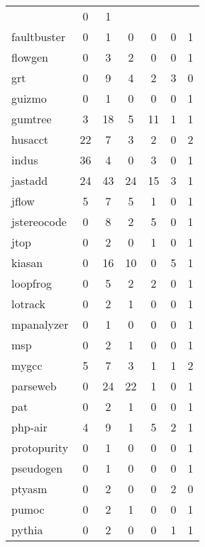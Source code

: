 \begin{table}[H]
\begin{tabular}{| l | c | c | c | c | c | c |}
  &
  0
  &
  1
  \\
  faultbuster
  &
  0
  &
  1
  &
  0
  &
  0
  &
  0
  &
  1
  \\
  flowgen
  &
  0
  &
  3
  &
  2
  &
  0
  &
  0
  &
  1
  \\
  grt
  &
  0
  &
  9
  &
  4
  &
  2
  &
  3
  &
  0
  \\
  guizmo
  &
  0
  &
  1
  &
  0
  &
  0
  &
  0
  &
  1
  \\
  gumtree
  &
  3
  &
  18
  &
  5
  &
  11
  &
  1
  &
  1
  \\
  husacct
  &
  22
  &
  7
  &
  3
  &
  2
  &
  0
  &
  2
  \\
  indus
  &
  36
  &
  4
  &
  0
  &
  3
  &
  0
  &
  1
  \\
  jastadd
  &
  24
  &
  43
  &
  24
  &
  15
  &
  3
  &
  1
  \\
  jflow
  &
  5
  &
  7
  &
  5
  &
  1
  &
  0
  &
  1
  \\
  jstereocode
  &
  0
  &
  8
  &
  2
  &
  5
  &
  0
  &
  1
  \\
  jtop
  &
  0
  &
  2
  &
  0
  &
  1
  &
  0
  &
  1
  \\
  kiasan
  &
  0
  &
  16
  &
  10
  &
  0
  &
  5
  &
  1
  \\
  loopfrog
  &
  0
  &
  5
  &
  2
  &
  2
  &
  0
  &
  1
  \\
  lotrack
  &
  0
  &
  2
  &
  1
  &
  0
  &
  0
  &
  1
  \\
  mpanalyzer
  &
  0
  &
  1
  &
  0
  &
  0
  &
  0
  &
  1
  \\
  msp
  &
  0
  &
  2
  &
  1
  &
  0
  &
  0
  &
  1
  \\
  mygcc
  &
  5
  &
  7
  &
  3
  &
  1
  &
  1
  &
  2
  \\
  parseweb
  &
  0
  &
  24
  &
  22
  &
  1
  &
  0
  &
  1
  \\
  pat
  &
  0
  &
  2
  &
  1
  &
  0
  &
  0
  &
  1
  \\
  php-air
  &
  4
  &
  9
  &
  1
  &
  5
  &
  2
  &
  1
  \\
  protopurity
  &
  0
  &
  1
  &
  0
  &
  0
  &
  0
  &
  1
  \\
  pseudogen
  &
  0
  &
  1
  &
  0
  &
  0
  &
  0
  &
  1
  \\
  ptyasm
  &
  0
  &
  2
  &
  0
  &
  0
  &
  2
  &
  0
  \\
  pumoc
  &
  0
  &
  2
  &
  1
  &
  0
  &
  0
  &
  1
  \\
  pythia
  &
  0
  &
  2
  &
  0
  &
  0
  &
  1
  &
  1
  \\

\end{tabular}
\end{table}
